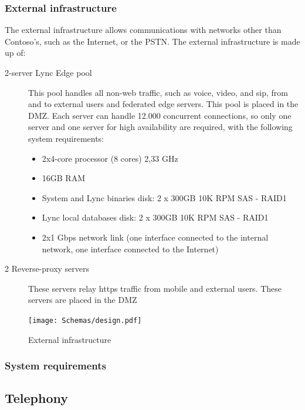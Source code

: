 	\subsubsection{External infrastructure}
	The external infrastructure allows communications with networks other than Contoso's, such as the Internet, or the PSTN.
	The external infrastructure is made up of:
	\begin{description}
		\item[2-server Lync Edge pool] This pool handles all non-web traffic, such as voice, video, and sip, from and to external users and federated edge servers. This pool is placed in the DMZ. Each server can handle 12.000 concurrent connections, so only one server and one server for high availability are required, with the following system requirements:
		\begin{itemize}
			\item 2x4-core processor (8 cores) 2,33 GHz
			\item 16GB RAM
			\item System and Lync binaries disk: 2 x 300GB 10K RPM SAS - RAID1
			\item Lync local databases disk: 2 x 300GB 10K RPM SAS - RAID1
			\item 2x1 Gbps network link (one interface connected to the internal network, one interface connected to the Internet)
		\end{itemize}
		
		\item[2 Reverse-proxy servers] These servers relay https traffic from mobile and external users. These servers are placed in the DMZ
	\end{description}
	\begin{figure}[H]
		\centering
		\texttt{[image: Schemas/design.pdf]}
		\caption{External infrastructure}
		\label{fig:case_extternal}
	\end{figure}

	\subsubsection{System requirements}






\subsection{Telephony}

